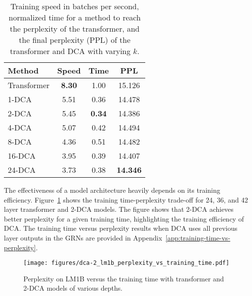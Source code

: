 \begin{table}[h]
    \vskip -0.1in
    \caption{Training speed in batches per second, normalized time for a method to reach the perplexity of the transformer, and the final perplexity (PPL) of the transformer and DCA with varying $k$.}
    \label{tab:first_last_k}
    \vskip 0.15in
    \begin{center}
    \begin{small}
    \begin{sc}
    \begin{tabular}{l|ccc}
        \toprule
        Method & Speed & Time & PPL \\
        \midrule
        Transformer & \textbf{8.30} & 1.00 & 15.126 \\
        1-DCA & 5.51 & 0.36 & 14.478 \\
        2-DCA & 5.45 & \textbf{0.34} & 14.386 \\
        4-DCA & 5.07 & 0.42 & 14.494 \\
        8-DCA & 4.36 & 0.51 & 14.482 \\
        16-DCA & 3.95 & 0.39 & 14.407 \\
        24-DCA & 3.73 &  0.38 & \textbf{14.346} \\
        \bottomrule
    \end{tabular}
    \end{sc}
    \end{small}
    \end{center}
    \vskip -0.1in
\end{table}

The effectiveness of a model architecture heavily depends on its training efficiency. Figure~\ref{fig:dca-2_perplexity_vs_training_time} shows the training time-perplexity trade-off for 24, 36, and 42 layer transformer and 2-DCA models. The figure shows that 2-DCA achieves better perplexity for a given training time, highlighting the training efficiency of DCA. The training time versus perplexity results when DCA uses all previous layer outputs in the GRNs are provided in Appendix~\ref{app:training-time-vs-perplexity}. 

\begin{figure}[h]
    \centering
    \texttt{[image: figures/dca-2\_lm1b\_perplexity\_vs\_training\_time.pdf]}
    \vskip -0.1in
    \caption{Perplexity on LM1B versus the training time with transformer and 2-DCA models of various depths.}
    \label{fig:dca-2_perplexity_vs_training_time}
\end{figure}

